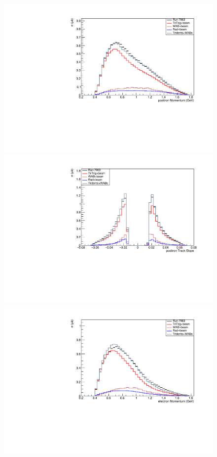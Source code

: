 \begin{figure}[tbhp]
      \includegraphics[scale=0.35]{figs/recon/xs-norm-data-EpEmTB-p1Mom-intruns-NoESumCut_pre-vertex-intplots.pdf}
      \includegraphics[scale=0.35]{figs/recon/xs-norm-data-EpEmTB-p1slope-intruns-NoESumCut_pre-vertex-intplots.pdf}
      \includegraphics[scale=0.35]{figs/recon/xs-norm-data-EpEmTB-p2Mom-intruns-NoESumCut_pre-vertex-intplots.pdf}

\end{figure}
